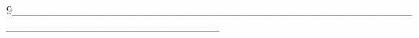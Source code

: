9________________________________________________________________________

\begin{titlepage}%
\maketitle
\thispagestyle{empty}%
\end{titlepage}
